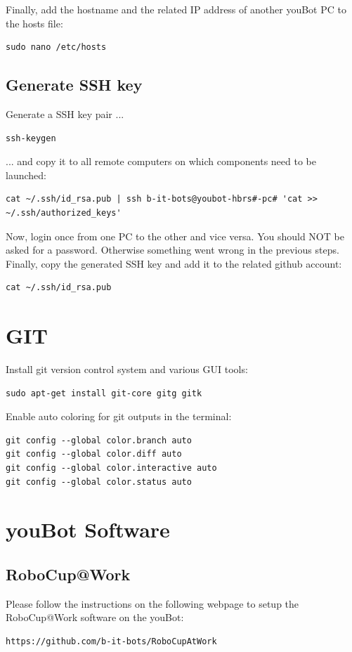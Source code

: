 \documentclass[a4paper,12pt]{article}
\begin{document}
Finally, add the hostname and the related IP address of another youBot PC to the hosts file:
\begin{lstlisting}
sudo nano /etc/hosts
\end{lstlisting}

\subsection{Generate SSH key}
Generate a SSH key pair ...
\begin{lstlisting}
ssh-keygen
\end{lstlisting}

... and copy it to all remote computers on which components need to be launched:
\begin{lstlisting}
cat ~/.ssh/id_rsa.pub | ssh b-it-bots@youbot-hbrs#-pc# 'cat >> ~/.ssh/authorized_keys'
\end{lstlisting}

Now, login once from one PC to the other and vice versa. You should NOT be asked for a password. Otherwise something went wrong in the previous steps.\\

Finally, copy the generated SSH key and add it to the related github account:
\begin{lstlisting}
cat ~/.ssh/id_rsa.pub
\end{lstlisting}




\newpage
\section{GIT}
Install git version control system and various GUI tools:
\begin{lstlisting}
sudo apt-get install git-core gitg gitk
\end{lstlisting}

Enable auto coloring for git outputs in the terminal:
\begin{lstlisting}
git config --global color.branch auto
git config --global color.diff auto
git config --global color.interactive auto
git config --global color.status auto
\end{lstlisting}



\newpage
\section{youBot Software}

\subsection{RoboCup@Work}
Please follow the instructions on the following webpage to setup the RoboCup@Work software on the youBot:
\begin{lstlisting}
https://github.com/b-it-bots/RoboCupAtWork
\end{lstlisting}
\end{document}
